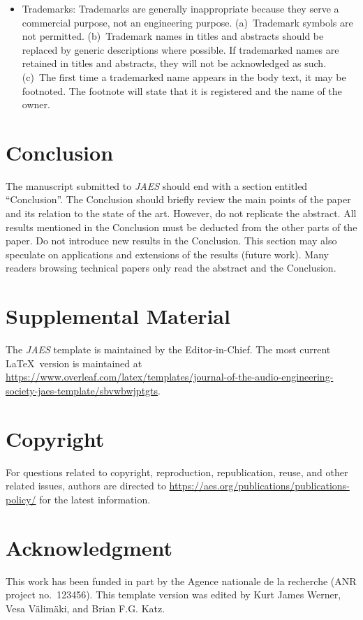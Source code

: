 \documentclass[fleqn]{jaes}
\begin{document}
\begin{itemize}
    \item Trademarks: Trademarks are generally inappropriate because they serve a commercial purpose, not an engineering purpose. (a)~Trademark symbols are not permitted. (b)~Trademark names in titles and abstracts should be replaced by generic descriptions where possible. If trademarked names are retained in titles and abstracts, they will not be acknowledged as such. (c)~The first time a trademarked name appears in the body text, it may be footnoted. The footnote will state that it is registered and the name of the owner.
\end{itemize}

\section{Conclusion}\label{sec:conc}
The manuscript submitted to \emph{JAES} should end with a section entitled ``Conclusion''. The Conclusion should briefly review the main points of the paper and its relation to the state of the art. However, do not replicate the abstract. All results mentioned in the Conclusion must be deducted from the other parts of the paper. Do not introduce new results in the Conclusion. This section may also speculate on applications and extensions of the results (future work). Many readers browsing technical papers only read the abstract and the Conclusion.

\section{Supplemental Material}

The \emph{JAES} template is maintained by the Editor-in-Chief. The most current \LaTeX\ version is maintained at \href{https://www.overleaf.com/latex/templates/journal-of-the-audio-engineering-society-jaes-template/sbvwbwjptgts}{https://www.overleaf.com/latex/templates/journal-of-the-audio-engineering-society-jaes-template/sbvwbwjptgts}.

\section{Copyright}\label{sec:Copyright}

For questions related to copyright, reproduction, republication, reuse, and other related issues, authors are directed to \url{https://aes.org/publications/publications-policy/} for the latest information. 

\section{Acknowledgment}
This  work  has  been  funded  in  part  by  the Agence nationale de la recherche (ANR project no.~123456). This template version was edited by Kurt James Werner, Vesa V\"alim\"aki, and Brian F.G. Katz. 
\end{document}
